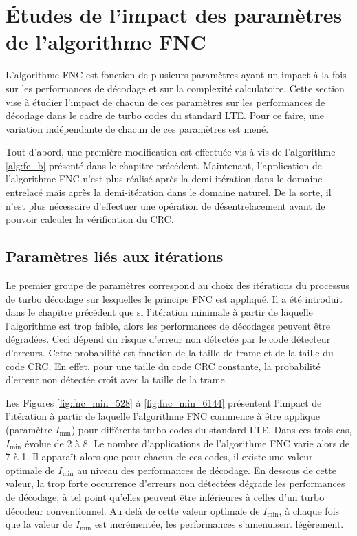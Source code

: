 \section{Études de l'impact des paramètres de l'algorithme FNC}
L'algorithme FNC est fonction de plusieurs paramètres ayant un impact à la fois sur les performances de décodage et sur
la complexité calculatoire. Cette section vise à étudier l'impact de chacun de ces paramètres sur les performances de 
décodage dans le cadre de turbo codes du standard LTE. Pour ce faire, une variation indépendante de chacun de ces 
paramètres est mené.

Tout d'abord, une première modification est effectuée vis-à-vis de l'algorithme \ref{alg:fc_b} présenté dans le chapitre
précédent. Maintenant, l'application de l'algorithme FNC n'est plus réalisé après la demi-itération dans le domaine
entrelacé mais après la demi-itération dans le domaine naturel. De la sorte, il n'est plus nécessaire d'effectuer une 
opération de désentrelacement avant de pouvoir calculer la vérification du CRC.

\subsection{Paramètres liés aux itérations}
Le premier groupe de paramètres correspond au choix des itérations du processus de turbo décodage sur lesquelles le 
principe FNC est appliqué. Il a été introduit dans le chapitre précédent que si l'itération minimale à partir de 
laquelle l'algorithme est trop faible, alors les performances de décodages peuvent être dégradées. Ceci dépend du risque 
d'erreur non détectée par le code détecteur d'erreurs. Cette probabilité est fonction de la taille de trame et de la 
taille du code CRC. En effet, pour une taille du code CRC constante, la probabilité d'erreur non détectée croît avec la
taille de la trame. 

Les Figures \ref{fig:fnc_min_528} à \ref{fig:fnc_min_6144} présentent l'impact de l'itération à partir de laquelle 
l'algorithme FNC commence à être applique (paramètre $I_\text{min}$) pour différents turbo codes du standard LTE. Dans 
ces trois cas, $I_\text{min}$ évolue de 2 à 8. Le nombre d'applications de l'algorithme FNC varie alors de 7 à 1. Il 
apparaît alors que pour chacun de ces codes, il existe une valeur optimale de $I_\text{min}$ au niveau des performances
de décodage. En dessous de cette valeur, la trop forte occurrence d'erreurs non détectées dégrade les performances de 
décodage, à tel point qu'elles peuvent être inférieures à celles d'un turbo décodeur conventionnel. Au delà de cette 
valeur optimale de $I_\text{min}$, à chaque fois que la valeur de $I_\text{min}$ est incrémentée, les performances
s'amenuisent légèrement.

